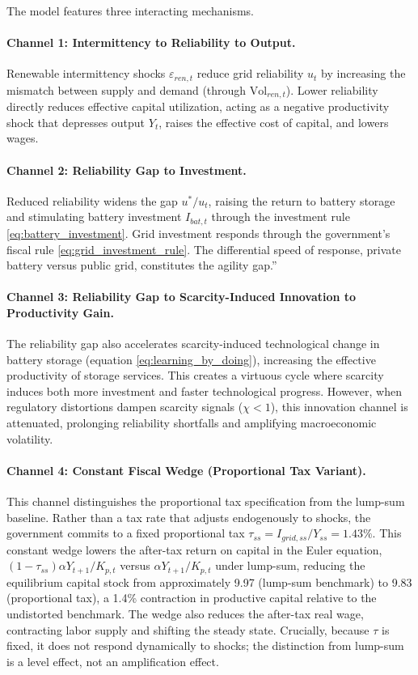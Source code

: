 \documentclass[12pt, a4paper]{article}
\begin{document}
	The model features three interacting mechanisms.
	
	\paragraph{Channel 1: Intermittency to Reliability to Output.}
	Renewable intermittency shocks $\varepsilon_{ren,t}$ reduce grid reliability $u_t$ by increasing the mismatch between supply and demand (through $\text{Vol}_{ren,t}$). Lower reliability directly reduces effective capital utilization, acting as a negative productivity shock that depresses output $Y_t$, raises the effective cost of capital, and lowers wages.
	
	\paragraph{Channel 2: Reliability Gap to Investment.}
	Reduced reliability widens the gap $u^*/u_t$, raising the return to battery storage and stimulating battery investment $I_{bat,t}$ through the investment rule \eqref{eq:battery_investment}. Grid investment responds through the government's fiscal rule \eqref{eq:grid_investment_rule}. The differential speed of response, private battery versus public grid, constitutes the agility gap.''
	
	\paragraph{Channel 3: Reliability Gap to Scarcity-Induced Innovation to Productivity Gain.}
	The reliability gap also accelerates scarcity-induced technological change in battery storage (equation \eqref{eq:learning_by_doing}), increasing the effective productivity of storage services. This creates a virtuous cycle where scarcity induces both more investment and faster technological progress. However, when regulatory distortions dampen scarcity signals ($\chi < 1$), this innovation channel is attenuated, prolonging reliability shortfalls and amplifying macroeconomic volatility.
	
	\paragraph{Channel 4: Constant Fiscal Wedge (Proportional Tax Variant).}
	This channel distinguishes the proportional tax specification from the lump-sum baseline. Rather than a tax rate that adjusts endogenously to shocks, the government commits to a fixed proportional tax $\tau_{ss} = I_{grid,ss}/Y_{ss} = 1.43\%$. This constant wedge lowers the after-tax return on capital in the Euler equation, $(1-\tau_{ss})\alpha Y_{t+1}/K_{p,t}$ versus $\alpha Y_{t+1}/K_{p,t}$ under lump-sum, reducing the equilibrium capital stock from approximately 9.97 (lump-sum benchmark) to 9.83 (proportional tax), a 1.4\% contraction in productive capital relative to the undistorted benchmark. The wedge also reduces the after-tax real wage, contracting labor supply and shifting the steady state. Crucially, because $\tau$ is fixed, it does not respond dynamically to shocks; the distinction from lump-sum is a level effect, not an amplification effect.
	
\end{document}
